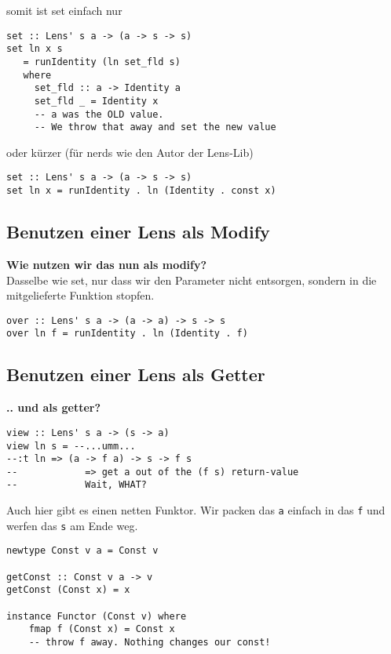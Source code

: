 \documentclass{beamer}
\begin{document}
\begin{frame}[fragile]
somit ist set einfach nur

\begin{verbatim}
set :: Lens' s a -> (a -> s -> s)
set ln x s
   = runIdentity (ln set_fld s)
   where
     set_fld :: a -> Identity a
     set_fld _ = Identity x
     -- a was the OLD value.
     -- We throw that away and set the new value
\end{verbatim}
\pause
oder kürzer (für nerds wie den Autor der Lens-Lib)

\begin{verbatim}
set :: Lens' s a -> (a -> s -> s)
set ln x = runIdentity . ln (Identity . const x)
\end{verbatim}
\end{frame}


\subsection{Benutzen einer Lens als Modify}
\begin{frame}[fragile]
\textbf{Wie nutzen wir das nun als modify?}\\
Dasselbe wie set, nur dass wir den Parameter nicht entsorgen, sondern in
die mitgelieferte Funktion stopfen.
\begin{verbatim}
over :: Lens' s a -> (a -> a) -> s -> s
over ln f = runIdentity . ln (Identity . f)
\end{verbatim}
\end{frame}

\subsection{Benutzen einer Lens als Getter}
\begin{frame}[fragile]
\textbf{.. und als getter?}
\begin{verbatim}
view :: Lens' s a -> (s -> a)
view ln s = --...umm...
--:t ln => (a -> f a) -> s -> f s
--            => get a out of the (f s) return-value
--            Wait, WHAT?
\end{verbatim}
\pause
Auch hier gibt es einen netten Funktor. Wir packen das \texttt{a} einfach in
das \texttt{f} und werfen das \texttt{s} am Ende weg.
\pause
\begin{verbatim}
newtype Const v a = Const v

getConst :: Const v a -> v
getConst (Const x) = x

instance Functor (Const v) where
    fmap f (Const x) = Const x
    -- throw f away. Nothing changes our const!
\end{verbatim}
\end{frame}
\end{document}
